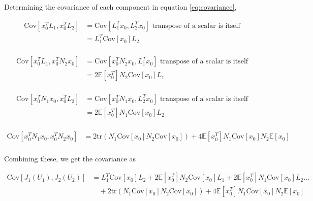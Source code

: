 \documentclass{article}
\begin{document}
Determining the covariance of each component in equation \ref{eq:covariance},

$$
\begin{aligned}
  \text{Cov}[x_0^T L_1, x_0^T L_2] &= \text{Cov}[L_1^T x_0, L_2^T x_0] \text{ transpose of a scalar is itself} \\
  &= L_1^T \text{Cov}[x_0] L_2 \\
\end{aligned}
$$

$$
\begin{aligned}
  \text{Cov}[x_0^T L_1, x_0^T N_2 x_0] &= \text{Cov}[x_0^T N_2 x_0, L_1^T x_0] \text{ transpose of a scalar is itself} \\
  &= 2 \mathbb{E}[x_0^T] N_2 \text{Cov}[x_0] L_1 \\
\end{aligned}
$$

$$
\begin{aligned}
  \text{Cov}[x_0^T N_1 x_0, x_0^T L_2] &= \text{Cov}[x_0^T N_1 x_0, L_2^T x_0] \text{ transpose of a scalar is itself} \\
  &= 2 \mathbb{E}[x_0^T] N_1 \text{Cov}[x_0] L_2 \\
\end{aligned}
$$

$$
\begin{aligned}
  \text{Cov}[x_0^T N_1 x_0, x_0^T N_2 x_0] &= 2 \text{tr}(N_1 \text{Cov}[x_0] N_2 \text{Cov}[x_0]) + 4 \mathbb{E}[x_0^T]N_1\text{Cov}[x_0]N_2\mathbb{E}[x_0] \\
\end{aligned}
$$

Combining these, we get the covariance as

\begin{equation}
  \begin{aligned}
    \text{Cov}[J_1(U_1), J_2(U_2)] &= L_1^T \text{Cov}[x_0] L_2 + 2 \mathbb{E}[x_0^T] N_2 \text{Cov}[x_0] L_1 + 2 \mathbb{E}[x_0^T] N_1 \text{Cov}[x_0] L_2 \hdots \\
    & \quad + 2 \text{tr}(N_1 \text{Cov}[x_0] N_2 \text{Cov}[x_0]) + 4 \mathbb{E}[x_0^T]N_1\text{Cov}[x_0]N_2\mathbb{E}[x_0]
  \end{aligned}
\end{equation}
\end{document}
